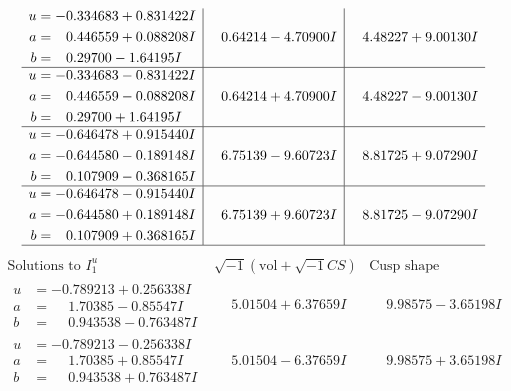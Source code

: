 \documentclass[1p]{elsarticle_modified}
\theoremstyle{definition}
\newcommand{\I}{\sqrt{-1}}
\begin{document}
$$\begin{array}{c|c|c}
\begin{aligned}
u &= -0.334683 + 0.831422 I \\
a &= \phantom{-}0.446559 + 0.088208 I \\
b &= \phantom{-}0.29700 - 1.64195 I\end{aligned}
 & \phantom{-}0.64214 - 4.70900 I & \phantom{-}4.48227 + 9.00130 I \\ \hline\begin{aligned}
u &= -0.334683 - 0.831422 I \\
a &= \phantom{-}0.446559 - 0.088208 I \\
b &= \phantom{-}0.29700 + 1.64195 I\end{aligned}
 & \phantom{-}0.64214 + 4.70900 I & \phantom{-}4.48227 - 9.00130 I \\ \hline\begin{aligned}
u &= -0.646478 + 0.915440 I \\
a &= -0.644580 - 0.189148 I \\
b &= \phantom{-}0.107909 - 0.368165 I\end{aligned}
 & \phantom{-}6.75139 - 9.60723 I & \phantom{-}8.81725 + 9.07290 I \\ \hline\begin{aligned}
u &= -0.646478 - 0.915440 I \\
a &= -0.644580 + 0.189148 I \\
b &= \phantom{-}0.107909 + 0.368165 I\end{aligned}
 & \phantom{-}6.75139 + 9.60723 I & \phantom{-}8.81725 - 9.07290 I\\
 \hline 
 \end{array}$$\newpage$$\begin{array}{c|c|c}  
\text{Solutions to }I^u_{1}& \I (\text{vol} + \sqrt{-1}CS) & \text{Cusp shape}\\
 \hline 
\begin{aligned}
u &= -0.789213 + 0.256338 I \\
a &= \phantom{-}1.70385 - 0.85547 I \\
b &= \phantom{-}0.943538 - 0.763487 I\end{aligned}
 & \phantom{-}5.01504 + 6.37659 I & \phantom{-}9.98575 - 3.65198 I \\ \hline\begin{aligned}
u &= -0.789213 - 0.256338 I \\
a &= \phantom{-}1.70385 + 0.85547 I \\
b &= \phantom{-}0.943538 + 0.763487 I\end{aligned}
 & \phantom{-}5.01504 - 6.37659 I & \phantom{-}9.98575 + 3.65198 I \\ \hline\begin{aligned}

\end{aligned}
\end{array}$$
\end{document}
